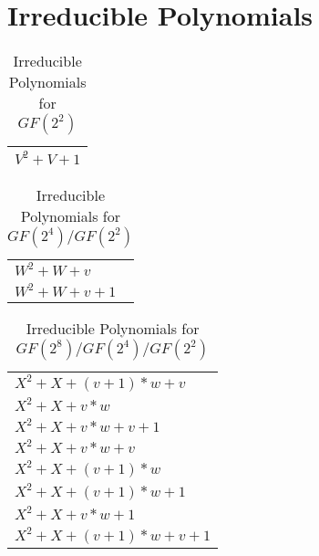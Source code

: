 \documentclass[12pt]{article}
\begin{document}
\section{Irreducible Polynomials}

\begin{center}
\begin{longtable}{|l|}
\caption[INNER TITLE]{Irreducible Polynomials for $GF(2^2)$}\\
\hline
	$V^2 + V + 1$ \\
\hline
\end{longtable}
\end{center}

\begin{center}
\begin{longtable}{|l|}
\caption[INNER TITLE]{Irreducible Polynomials for $GF(2^4)/GF(2^2)$}\\
\hline
	$W^2 + W + v$ \\
	$W^2 + W + v + 1$ \\
\hline
\end{longtable}
\end{center}

\begin{center}
\begin{longtable}{|l|}
\caption[INNER TITLE]{Irreducible Polynomials for $GF(2^8)/GF(2^4)/GF(2^2)$}\\
\hline
	$X^2 + X + (v + 1)*w + v$ \\
	$X^2 + X + v*w$ \\
	$X^2 + X + v*w + v + 1$ \\
	$X^2 + X + v*w + v$ \\
	$X^2 + X + (v + 1)*w$ \\
	$X^2 + X + (v + 1)*w + 1$ \\
	$X^2 + X + v*w + 1$ \\
	$X^2 + X + (v + 1)*w + v + 1$ \\
\hline
\end{longtable}
\end{center}
\end{document}
